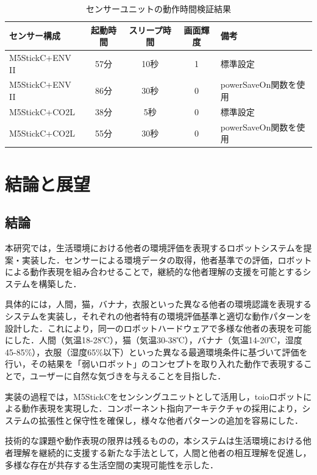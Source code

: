 \documentclass{cuxarticle}
\begin{document}
\begin{table}[htbp]
  \caption{センサーユニットの動作時間検証結果}
  \label{table:battery}
  \centering
  \begin{tabular}{|l|c|c|c|l|}
    \hline
    センサー構成 & 起動時間 & スリープ時間 & 画面輝度 & 備考 \\
    \hline
    M5StickC+ENV II & 57分 & 10秒 & 1 & 標準設定 \\
    \hline
    M5StickC+ENV II & 86分 & 30秒 & 0 & powerSaveOn関数を使用 \\
    \hline
    M5StickC+CO2L & 38分 & 5秒 & 0 & 標準設定 \\
    \hline
    M5StickC+CO2L & 55分 & 30秒 & 0 & powerSaveOn関数を使用 \\
    \hline
  \end{tabular}
\end{table}

\chapter{結論と展望}

\section{結論}
本研究では，生活環境における他者の環境評価を表現するロボットシステムを提案・実装した．センサーによる環境データの取得，他者基準での評価，ロボットによる動作表現を組み合わせることで，継続的な他者理解の支援を可能とするシステムを構築した．

具体的には，人間，猫，バナナ，衣服といった異なる他者の環境認識を表現するシステムを実装し，それぞれの他者特有の環境評価基準と適切な動作パターンを設計した．これにより，同一のロボットハードウェアで多様な他者の表現を可能にした．人間（気温18-28℃），猫（気温30-38℃），バナナ（気温14-20℃，湿度45-85\%），衣服（湿度65\%以下）といった異なる最適環境条件に基づいて評価を行い，その結果を「弱いロボット」のコンセプトを取り入れた動作で表現することで，ユーザーに自然な気づきを与えることを目指した．

実装の過程では，M5StickCをセンシングユニットとして活用し，toioロボットによる動作表現を実現した．コンポーネント指向アーキテクチャの採用により，システムの拡張性と保守性を確保し，様々な他者パターンの追加を容易にした．

技術的な課題や動作表現の限界は残るものの，本システムは生活環境における他者理解を継続的に支援する新たな手法として，人間と他者の相互理解を促進し，多様な存在が共存する生活空間の実現可能性を示した．
\end{document}
